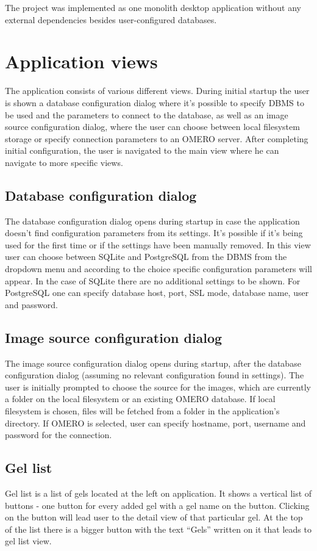 The project was implemented as one monolith desktop application without any external dependencies besides user-configured databases.

\section{Application views}
The application consists of various different views. During initial startup the user is shown a database configuration dialog where it’s possible to specify DBMS to be used and the parameters to connect to the database, as well as an image source configuration dialog, where the user can choose between local filesystem storage or specify connection parameters to an OMERO server. After completing initial configuration, the user is navigated to the main view where he can navigate to more specific views.

\subsection{Database configuration dialog}
The database configuration dialog opens during startup in case the application doesn’t find configuration parameters from its settings. It’s possible if it’s being used for the first time or if the settings have been manually removed. In this view user can choose between SQLite and PostgreSQL from the DBMS from the dropdown menu and according to the choice specific configuration parameters will appear. In the case of SQLite there are no additional settings to be shown. For PostgreSQL one can specify database host, port, SSL mode, database name, user and password.

\subsection{Image source configuration dialog}
The image source configuration dialog opens during startup, after the database configuration dialog (assuming no relevant configuration found in settings). The user is initially prompted to choose the source for the images, which are currently a folder on the local filesystem or an existing OMERO database. If local filesystem is chosen, files will be fetched from a folder in the application’s directory. If OMERO is selected, user can specify hostname, port, username and password for the connection.

\subsection{Gel list}
Gel list is a list of gels located at the left on application. It shows a vertical list of buttons - one button for every added gel with a gel name on the button. Clicking on the button will lead user to the detail view of that particular gel. At the top of the list there is a bigger button with the text “Gels” written on it that leads to gel list view.

